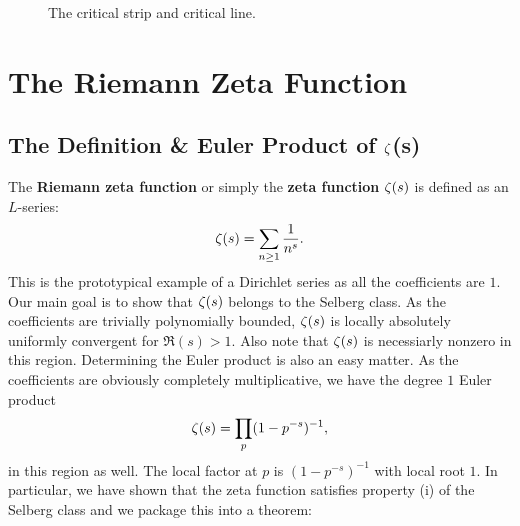       \begin{figure}[ht]
        \centering
        \caption{The critical strip and critical line.}
        \label{fig:critical_strip}
      \end{figure}
  \section{The Riemann Zeta Function}\label{sec:The_Riemann_Zeta_Function}
    \subsection*{The Definition \& Euler Product of \texorpdfstring{$\zeta$}{\z}(s)}
      The \textbf{Riemann zeta function} or simply the \textbf{zeta function} $\zeta(s)$ is defined as an $L$-series:
      \[
        \zeta(s) = \sum_{n \ge 1}\frac{1}{n^{s}}.
      \]
      This is the prototypical example of a Dirichlet series as all the coefficients are $1$. Our main goal is to show that $\zeta(s)$ belongs to the Selberg class. As the coefficients are trivially polynomially bounded, $\zeta(s)$ is locally absolutely uniformly convergent for $\Re(s) > 1$. Also note that $\zeta(s)$ is necessiarly nonzero in this region. Determining the Euler product is also an easy matter. As the coefficients are obviously completely multiplicative, we have the degree $1$ Euler product
      \[
        \zeta(s) = \prod_{p}(1-p^{-s})^{-1},
      \]
      in this region as well. The local factor at $p$ is $(1-p^{-s})^{-1}$ with local root $1$. In particular, we have shown that the zeta function satisfies property (i) of the Selberg class and we package this into a theorem:

